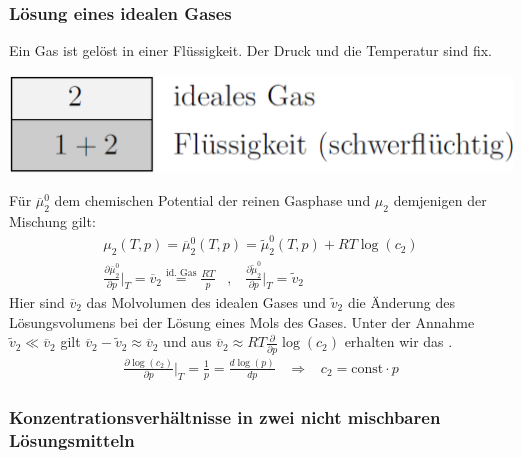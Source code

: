 \subsubsection{Lösung eines idealen Gases}

\begin{minipage}{0.22\textwidth}
    Ein Gas ist gelöst in einer Flüssigkeit. Der Druck und die Temperatur sind fix.
\end{minipage} \hspace{5pt}
\begin{minipage}{0.25\textwidth}
    \includegraphics[width=\textwidth]{Bilder/Loesung_ideales_gas.png}
\end{minipage}

Für $\overline{\mu}_2^0$ dem chemischen Potential der reinen Gasphase und $\mu_2$
demjenigen der Mischung gilt:
\begin{align*}
    \mu_2 (T,p) = \overline{\mu}_2^0 (T,p) = \tilde{\mu}_2^0 (T,p) + R T \log(c_2)
    \\
    \frac{\partial \overline{\mu}_2^0}{\partial p} \Big|_T = \overline{v}_2
    \stackrel{\text{id. Gas}}{=} \frac{R T}{p}
    \hspace{10pt} , \hspace{10pt}
    \frac{\partial \tilde{\mu}_2^0}{\partial p} \Big|_T = \tilde{v}_2
\end{align*}
Hier sind $\overline{v}_2$ das Molvolumen des idealen Gases und $\tilde{v}_2$ die
Änderung des Lösungsvolumens bei der Lösung eines Mols des Gases. Unter der Annahme
$\tilde{v}_2 \ll \overline{v}_2$ gilt $\overline{v}_2 - \tilde{v}_2 \approx \overline{v}_2$
und aus $\overline{v}_2 \approx R T \frac{\partial}{\partial p} \log(c_2)$ erhalten
wir das .
\begin{align*}
    \frac{\partial \log(c_2)}{\partial p} \Big|_T = \frac{1}{p} = \frac{d \log(p)}{dp}
    \hspace{10pt} \Rightarrow \hspace{10pt}
    c_2 = \text{const} \cdot p
\end{align*}

\subsubsection{Konzentrationsverhältnisse in zwei nicht mischbaren Lösungsmitteln}


